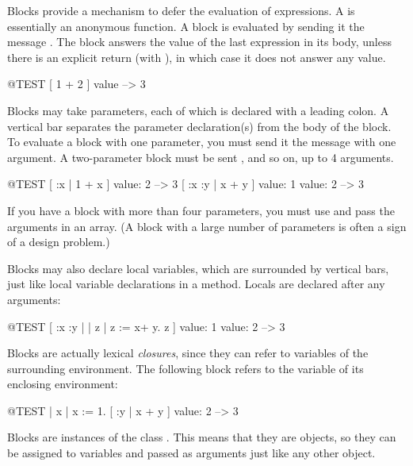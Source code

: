 \documentclass[a4paper,10pt,twoside]{book}
\begin{document}
Blocks provide a mechanism to defer the evaluation of expressions.
A  is essentially an anonymous function. A block is evaluated by sending it the message .
The block answers the value of the last expression in its body, unless there is an explicit return (with \ct{^}), in which case it does not answer any value.

\begin{code}{@TEST}
[ 1 + 2 ] value --> 3
\end{code}

Blocks may take parameters, each of which is declared with a leading colon.
A  vertical bar separates the parameter declaration(s) from the body of the block.
To evaluate a block with one parameter, you must send it the message  with one argument.
A two-parameter block must be sent , and so on, up to 4 arguments.

\begin{code}{@TEST}
[ :x | 1 + x ] value: 2 --> 3
[ :x :y | x + y ] value: 1 value: 2 --> 3
\end{code}

If you have a block with more than four parameters, you must use  and pass the arguments in an array.
(A block with a large number of parameters is often a sign of a design problem.)

Blocks may also declare local variables, which are surrounded by vertical bars, just like local variable declarations in a method.
Locals are declared after any arguments:

\begin{code}{@TEST}
[ :x :y | | z | z := x+ y. z ] value: 1 value: 2 --> 3
\end{code}

Blocks are actually lexical \emph{closures}, since they can refer to variables of the surrounding environment.
The following block refers to the variable  of its enclosing environment:

\begin{code}{@TEST}
| x |
x := 1.
[ :y | x + y ] value: 2 --> 3
\end{code}

Blocks are instances of the class .
This means that they are objects, so they can be assigned to variables and passed as arguments just like any other object.
\end{document}
